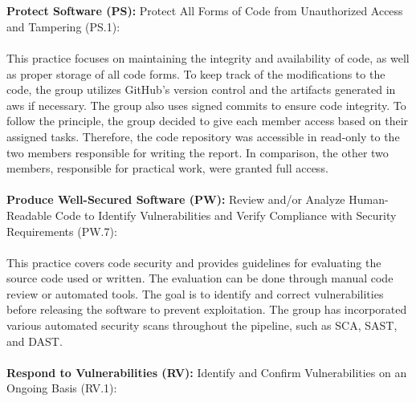 \\~\\        
\textbf{Protect Software (PS):}
Protect All Forms of Code from Unauthorized
Access and Tampering (PS.1): \textit{}\cite{ssdf}
\\~\\
This practice focuses on maintaining the integrity and availability of code, as well as proper storage of all code forms. To keep track of the modifications to the code, the group utilizes GitHub's version control and the artifacts generated in \acrshort{aws} if necessary. The group also uses signed commits to ensure code integrity. To follow the  principle, the group decided to give each member access based on their assigned tasks. Therefore, the code repository was accessible in read-only to the two members responsible for writing the report. In comparison, the other two members, responsible for practical work, were granted full access. 
\\~\\
\textbf{Produce Well-Secured Software (PW):} Review and/or Analyze Human-Readable
Code to Identify Vulnerabilities and Verify Compliance with Security Requirements (PW.7): \textit{}\cite{ssdf}
\\~\\
This practice covers code security and provides guidelines for evaluating the source code used or written. The evaluation can be done through manual code review or automated tools. The goal is to identify and correct vulnerabilities before releasing the software to prevent exploitation. The group has incorporated various automated security scans throughout the pipeline, such as SCA, SAST, and DAST. 
\\~\\
\textbf{Respond to Vulnerabilities (RV):}
Identify and Confirm Vulnerabilities on an Ongoing Basis (RV.1): \textit{}\cite{ssdf}
